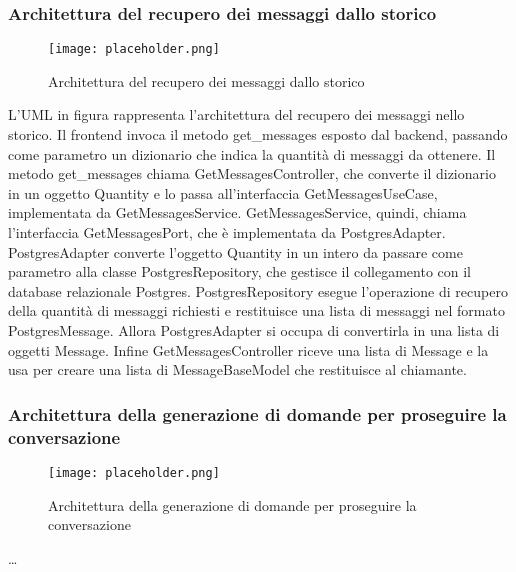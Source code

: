 \newpage


\subsubsection{Architettura del recupero dei messaggi dallo storico}
\label{sec:architettura_recupero_messaggi_storico}

\begin{figure}[h]
    \centering
    \texttt{[image: placeholder.png]}
    \caption{Architettura del recupero dei messaggi dallo storico}
\end{figure}

L'UML in figura rappresenta l'architettura del recupero dei messaggi nello storico.
Il frontend invoca il metodo get\_messages esposto dal backend, passando come parametro un dizionario che indica la quantità di messaggi da ottenere.
Il metodo get\_messages chiama GetMessagesController, che converte il dizionario in un oggetto Quantity e lo passa all'interfaccia GetMessagesUseCase, implementata da GetMessagesService.
GetMessagesService, quindi, chiama l'interfaccia GetMessagesPort, che è implementata da PostgresAdapter.
PostgresAdapter converte l'oggetto Quantity in un intero da passare come parametro alla classe PostgresRepository, che gestisce il collegamento con il database relazionale Postgres. 
PostgresRepository esegue l’operazione di recupero della quantità di messaggi richiesti e restituisce una lista di messaggi nel formato PostgresMessage.
Allora PostgresAdapter si occupa di convertirla in una lista di oggetti Message.
Infine GetMessagesController riceve una lista di Message e la usa per creare una lista di MessageBaseModel che restituisce al chiamante.

\newpage


\subsubsection{Architettura della generazione di domande per proseguire la conversazione}
\label{sec:architettura_generazione_domande_conversazione}

\begin{figure}[h]
    \centering
    \texttt{[image: placeholder.png]}
    \caption{Architettura della generazione di domande per proseguire la conversazione}
\end{figure}

\dots

\newpage



